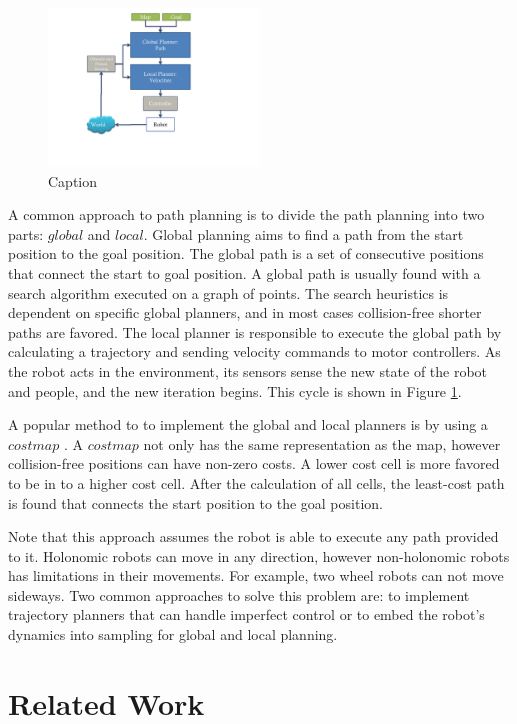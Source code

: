 \documentclass[12pt]{gatech-thesis}
\begin{document}
\begin{figure}[ht!]
\centering
\includegraphics[width=0.5\textwidth]{pics/navigation_overview}
\caption{Caption}
\label{fig:navigation_overview}
\end{figure}

A common approach to path planning is to divide the path planning into two parts: $global$ and $local$. Global planning aims to find a path from the start position to the goal position. The global path is a set of consecutive positions that connect the start to goal position. A global path is usually found with a search algorithm executed on a graph of points. The search heuristics is dependent on specific global planners, and in most cases collision-free shorter paths are favored. The local planner is responsible to execute the global path by calculating a trajectory and sending velocity commands to motor controllers. As the robot acts in the environment, its sensors sense the new state of the robot and people, and the new iteration begins. This cycle is shown in Figure \ref{fig:navigation_overview}. 

A popular method to to implement the global and local planners is by using a $costmap$ . A $costmap$ not only has the same representation as the map, however collision-free positions can have non-zero costs. A lower cost cell is more favored to be in to a higher cost cell. After the calculation of all cells, the least-cost path is found that connects the start position to the goal position.

Note that this approach assumes the robot is able to execute any path provided to it. Holonomic robots can move in any direction, however non-holonomic robots has limitations in their movements. For example, two wheel robots can not move sideways. Two common approaches to solve this problem are: to implement trajectory planners that can handle imperfect control or to embed the robot's dynamics into sampling for global and local planning.

\section{Related Work}
\label{sec:navigation_related_work}
\end{document}
